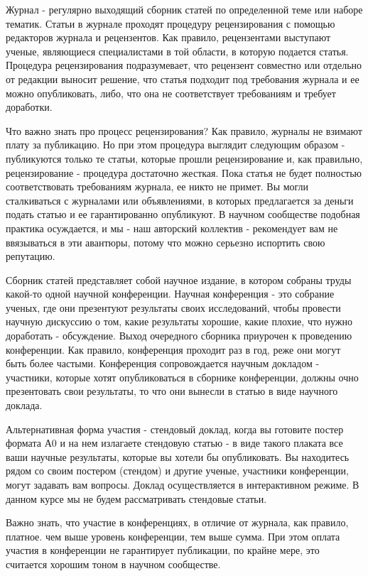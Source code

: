 \documentclass{report}
\begin{document}
Журнал - регулярно выходящий сборник статей по определенной теме или наборе тематик. Статьи в журнале проходят процедуру рецензирования с помощью редакторов журнала и рецензентов. Как правило, рецензентами выступают ученые, являющиеся специалистами в той области, в которую подается статья. Процедура рецензирования подразумевает, что рецензент совместно или отдельно от редакции выносит решение, что статья подходит под требования журнала и ее можно опубликовать, либо, что она не соответствует требованиям и требует доработки.

Что важно знать про процесс рецензирования? Как правило, журналы не взимают плату за публикацию. Но при этом процедура выглядит следующим образом - публикуются только те статьи, которые прошли рецензирование и, как правильно, рецензирование - процедура достаточно жесткая. Пока статья не будет полностью соответствовать требованиям журнала, ее никто не примет. Вы могли сталкиваться с журналами или объявлениями, в которых предлагается за деньги подать статью и ее гарантированно опубликуют. В научном сообществе подобная практика осуждается, и мы - наш авторский коллектив - рекомендует вам не ввязываться в эти авантюры, потому что можно серьезно испортить свою репутацию.

Сборник статей представляет собой научное издание, в котором собраны труды какой-то одной научной конференции. Научная конференция - это собрание ученых, где они презентуют результаты своих исследований, чтобы провести научную дискуссию  о том, какие результаты хорошие, какие плохие, что нужно доработать - обсуждение. Выход очередного сборника приурочен к проведению конференции. Как правило, конференция проходит раз в год, реже они могут быть более частыми. Конференция сопровождается научным докладом - участники, которые хотят опубликоваться в сборнике конференции, должны очно презентовать свои результаты, то что они вынесли в статью в виде научного доклада. 

Альтернативная форма участия - стендовый доклад, когда вы готовите постер формата А0 и на нем излагаете стендовую статью - в виде такого плаката все ваши научные результаты, которые вы хотели бы опубликовать. Вы находитесь рядом со своим постером (стендом) и другие ученые, участники конференции, могут задавать вам вопросы. Доклад осуществляется в интерактивном режиме. В данном курсе мы не будем рассматривать стендовые статьи. 

Важно знать, что участие в конференциях, в отличие от журнала, как правило, платное. чем выше уровень конференции, тем выше сумма. При этом оплата участия в конференции не гарантирует публикации, по крайне мере, это считается хорошим тоном в научном сообществе. 
\end{document}
